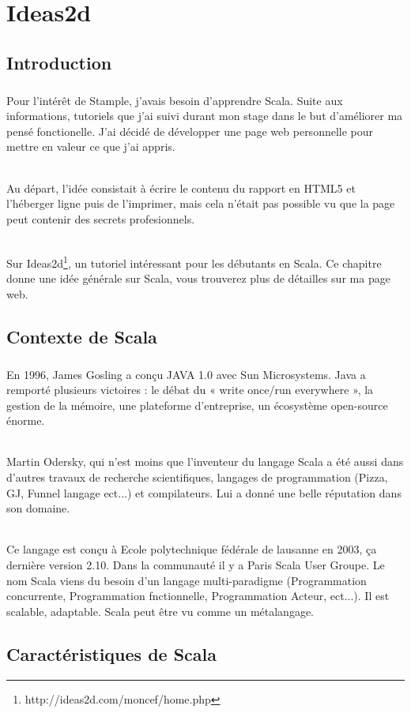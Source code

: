 \chapter{Ideas2d}
\section{Introduction}
\paragraph{}
Pour l'intérêt de Stample, j'avais besoin d'apprendre Scala.
Suite aux informations, tutoriels que j'ai suivi durant mon stage dans le but d'améliorer ma pensé fonctionelle. J'ai décidé de développer une page web personnelle pour mettre en valeur ce que j'ai appris.
\subparagraph{}
Au départ, l'idée consistait à écrire le contenu du rapport en HTML5 et l'héberger ligne puis de l'imprimer, mais cela n'était pas possible vu que la page peut contenir des secrets profesionnels. 
\subparagraph{}
Sur Ideas2d\footnote{http://ideas2d.com/moncef/home.php}, un tutoriel intéressant pour les débutants en Scala.
Ce chapitre donne une idée générale sur Scala, vous trouverez plus de détailles sur ma page web.
\section{Contexte de Scala}
\paragraph{}
En 1996, James Gosling a conçu JAVA 1.0 avec Sun Microsystems.
Java a remporté plusieurs victoires : le débat du « write once/run everywhere », la gestion de la mémoire, une plateforme d'entreprise, un écosystème open-source énorme.
\subparagraph{}
Martin Odersky, qui n'est moins que l'inventeur du langage Scala a été aussi dans d'autres travaux de recherche scientifiques, langages de programmation (Pizza, GJ, Funnel langage ect...) et compilateurs. Lui a donné une belle réputation dans son domaine.
\subparagraph{}
Ce langage est conçu à  Ecole polytechnique fédérale de lausanne en 2003, ça dernière version 2.10. Dans la communauté il y a Paris Scala User Groupe.\newline
Le nom Scala viens du besoin d'un langage multi-paradigme (Programmation concurrente, Programmation fnctionnelle, Programmation Acteur, ect...). Il est scalable, adaptable. Scala peut être vu comme un métalangage.
\section{Caractéristiques de Scala}

